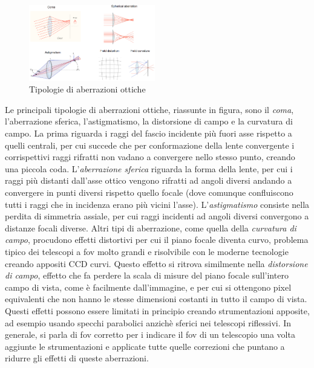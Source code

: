 \begin{figure}
	\vspace{-10pt}
	\centering
	\includegraphics[width=0.49\textwidth]{Immagini/Capitolo2/Aberrazioni.png}
	\caption{Tipologie di aberrazioni ottiche}
	\vspace{-10pt}
\end{figure}

Le principali tipologie di aberrazioni ottiche, riassunte in figura, sono il \textit{coma}, l'aberrazione sferica, l'astigmatismo, la distorsione di campo e la curvatura di campo. La prima riguarda i raggi del fascio incidente più fuori asse rispetto a quelli centrali, per cui succede che per conformazione della lente convergente i corrispettivi raggi rifratti non vadano a convergere nello stesso punto, creando una piccola coda. L'\textit{aberrazione sferica} riguarda la forma della lente, per cui i raggi più distanti dall'asse ottico vengono rifratti ad angoli diversi andando a convergere in punti diversi rispetto quello focale (dove comunque confluiscono tutti i raggi che in incidenza erano più vicini l'asse). L'\textit{astigmatismo} consiste nella perdita di simmetria assiale, per cui raggi incidenti ad angoli diversi convergono a distanze focali diverse. Altri tipi di aberrazione, come quella della \textit{curvatura di campo}, procudono effetti distortivi per cui il piano focale diventa curvo, problema tipico dei telescopi a fov molto grandi e risolvibile con le moderne tecnologie creando appositi CCD curvi. Questo effetto si ritrova similmente nella \textit{distorsione di campo}, effetto che fa perdere la scala di misure del piano focale sull'intero campo di vista, come è facilmente dall'immagine, e per cui si ottengono pixel equivalenti che non hanno le stesse dimensioni costanti in tutto il campo di vista. Questi effetti possono essere limitati in principio creando strumentazioni apposite, ad esempio usando specchi parabolici anzichè sferici nei telescopi riflessivi. In generale, si parla di fov corretto per i indicare il fov di un telescopio una volta aggiunte le strumentazioni e applicate tutte quelle correzioni che puntano a ridurre gli effetti di queste aberrazioni.

